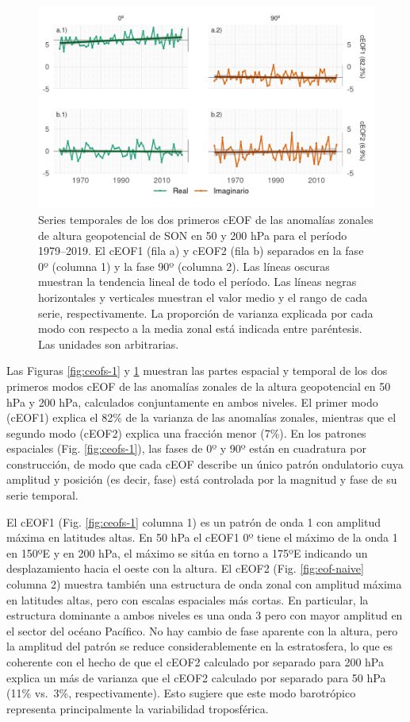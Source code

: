 \documentclass[12pt,oneside]{reedthesis}
\begin{document}
\begin{figure}
\includegraphics{figures/20-ceofs/extended-series-1} \caption{Series temporales de los dos primeros cEOF de las anomalías zonales de altura geopotencial de SON en 50 y 200 hPa para el período 1979--2019.
El cEOF1 (fila a) y cEOF2 (fila b) separados en la fase 0º (columna 1) y la fase 90º (columna 2).
Las líneas oscuras muestran la tendencia lineal de todo el período.
Las líneas negras horizontales y verticales muestran el valor medio y el rango de cada serie, respectivamente.
La proporción de varianza explicada por cada modo con respecto a la media zonal está indicada entre paréntesis.
Las unidades son arbitrarias.}\label{fig:extended-series}
\end{figure}

Las Figuras \ref{fig:ceofs-1} y \ref{fig:extended-series} muestran las partes espacial y temporal de los dos primeros modos cEOF de las anomalías zonales de la altura geopotencial en 50 hPa y 200 hPa, calculados conjuntamente en ambos niveles.
El primer modo (cEOF1) explica el 82\% de la varianza de las anomalías zonales, mientras que el segundo modo (cEOF2) explica una fracción menor (7\%).
En los patrones espaciales (Fig. \ref{fig:ceofs-1}), las fases de 0º y 90º están en cuadratura por construcción, de modo que cada cEOF describe un único patrón ondulatorio cuya amplitud y posición (es decir, fase) está controlada por la magnitud y fase de su serie temporal.

El cEOF1 (Fig. \ref{fig:ceofs-1} columna 1) es un patrón de onda 1 con amplitud máxima en latitudes altas.
En 50 hPa el cEOF1 0º tiene el máximo de la onda 1 en 150ºE y en 200 hPa, el máximo se sitúa en torno a 175ºE indicando un desplazamiento hacia el oeste con la altura.
El cEOF2 (Fig. \ref{fig:eof-naive} columna 2) muestra también una estructura de onda zonal con amplitud máxima en latitudes altas, pero con escalas espaciales más cortas.
En particular, la estructura dominante a ambos niveles es una onda 3 pero con mayor amplitud en el sector del océano Pacífico.
No hay cambio de fase aparente con la altura, pero la amplitud del patrón se reduce considerablemente en la estratosfera, lo que es coherente con el hecho de que el cEOF2 calculado por separado para 200 hPa explica un más de varianza que el cEOF2 calculado por separado para 50 hPa (11\% vs.~3\%, respectivamente).
Esto sugiere que este modo barotrópico representa principalmente la variabilidad troposférica.
\end{document}

